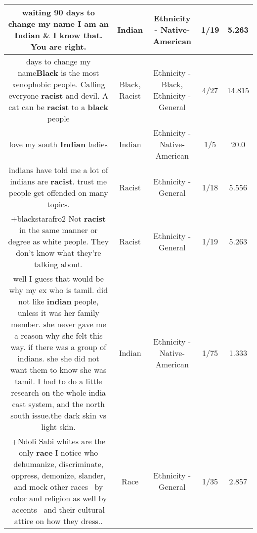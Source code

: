 \documentclass[11pt]{article}
\newlength\mylength
\begin{document}
\begin{center}
\begin{longtable}{|C{.65\mylength}|C{.30\mylength}|C{.12\mylength}|C{.12\mylength}|C{.12\mylength}|}
  \small \@ waiting 90 days to change my name I am an \textbf{Indian} \& I know that. You are right.\normalsize   & Indian & Ethnicity - Native-American & 1/19 & 5.263 \\  \hline
  \small {} days to change my name\textbf{Black} is the most xenophobic people. Calling everyone \textbf{racist} and devil. A cat can be \textbf{racist} to a \textbf{black} people\normalsize   & Black, Racist & Ethnicity - Black, Ethnicity - General & 4/27 & 14.815 \\  \hline
  \small love my south \textbf{Indian} ladies\normalsize   & Indian & Ethnicity - Native-American & 1/5 & 20.0 \\  \hline
  \small indians have told me a lot of indians are \textbf{racist}. trust me people get offended on many topics.\normalsize   & Racist & Ethnicity - General & 1/18 & 5.556 \\  \hline
  \small +blackstarafro2 Not \textbf{racist} in the same manner or degree as white people. They don't know what they're talking about.\normalsize   & Racist & Ethnicity - General & 1/19 & 5.263 \\  \hline
  \small well I guess that would be why my ex who is tamil. did not like \textbf{indian} people, unless it was her family member. she never gave me a reason why she felt this way. if there was a group of indians. she she did not want them to know she was tamil. I had to do a little research on the whole india cast system, and the north south issue.the dark skin vs light skin.\normalsize   & Indian & Ethnicity - Native-American & 1/75 & 1.333 \\  \hline
  \small +Ndoli Sabi whites are the only \textbf{race} I notice who dehumanize, discriminate, oppress, demonize, slander, and mock other races  by color and religion as well by accents  and their cultural attire on how they dress..\normalsize   & Race & Ethnicity - General & 1/35 & 2.857 \\  \hline

\end{longtable}
\end{center}
\end{document}
